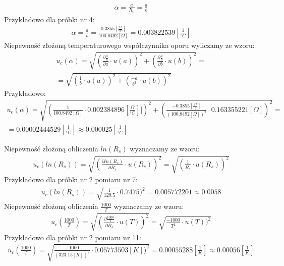 \documentclass[11pt]{article}
\begin{document}
    \begin{gather*}
        \alpha = \frac{a}{R_0}=\frac{a}{b}
    \end{gather*}
    Przykładowo dla próbki nr 4:
    \begin{gather*}
        \alpha =\frac{a}{b}=\frac{0.3855[\frac{\Omega}{^\circ C}]}{100.8492[\Omega]}=0.003822539[\frac{1}{^\circ C}]
    \end{gather*}
    Niepewność złożoną temperaturowego współczynnika oporu wyliczamy ze wzoru:
    \begin{gather*}
        u_c(\alpha)=\sqrt{\left(\frac{\partial \frac{a}{b}}{\partial a}\cdot u(a)\right)^2+\left(\frac{\partial \frac{a}{b}}{\partial b}\cdot u(b)\right)^2}=\\
        =\sqrt{\left(\frac{1}{b}\cdot u(a)\right)^2+\left(\frac{-a}{b^2}\cdot u(b)\right)^2}
    \end{gather*}
    Przykładowo:
    \begin{gather*}
        u_c(\alpha)=\sqrt{\left(\frac{1}{100.8492[\Omega]}\cdot 0.002384896[\frac{\Omega}{^\circ C}]]\right)^2+\left(\frac{-0.3855[\frac{\Omega}{^\circ C}]}{(100.8492[\Omega])^2}\cdot 0.163355221[\Omega]\right)^2}=\\
        =0.00002444529[\frac{1}{^\circ C}]\approx 0.000025[\frac{1}{^\circ C}]
    \end{gather*}

    Niepewność złożoną obliczenia $ln(R_s)$ wyznaczamy ze wzoru:
    \begin{gather*}
        u_c(ln(R_s))=\sqrt{(\frac{\partial ln(R_s)}{\partial R_s}\cdot u(R_s))^2}=
        \sqrt{(\frac{1}{R_s}\cdot u(R_s))^2}
    \end{gather*}
    Przykładowo dla próbki nr 2 pomiaru nr 7:
    \begin{gather*}
        u_c(ln(R_s))=\sqrt{\frac{1}{129.5}\cdot 0.7475)^2}=0.005772201\approx 0.0058
    \end{gather*}
    Niepewność złożoną obliczenia $\frac{1000}{T}$ wyznaczamy ze wzoru:
    \begin{gather*}
        u_c(\frac{1000}{T})=\sqrt{(\frac{\partial \frac{1000}{T}}{\partial R_s}\cdot u(T))^2}=
        \sqrt{\frac{-1000}{T^2}\cdot u(T))^2}
    \end{gather*}
    Przykładowo dla próbki nr 2 pomiaru nr 11:
    \begin{gather*}
        u_c(\frac{1000}{T})=\sqrt{\frac{-1000}{(323.15[K])^2}\cdot 0.05773503[K])^2}=0.00055288[\frac{1}{K}]\approx 0.00056[\frac{1}{K}]
    \end{gather*}
\end{document}
